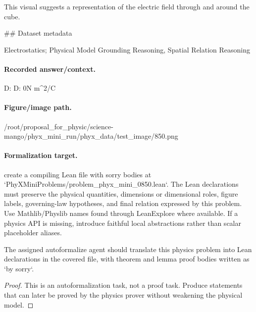 This visual suggests a representation of the electric field through and around the cube.

\#\# Dataset metadata

Electrostatics; Physical Model Grounding Reasoning, Spatial Relation Reasoning

\paragraph{Recorded answer/context.}
D: D: 0N m\textasciicircum{}2/C

\paragraph{Figure/image path.}
/root/proposal\_for\_physic/science-mango/phyx\_mini\_run/phyx\_data/test\_image/850.png

\paragraph{Formalization target.}
create a compiling Lean file with sorry bodies at `PhyXMiniProblems/problem\_phyx\_mini\_0850.lean`. The Lean declarations must preserve the physical quantities, dimensions or dimensional roles, figure labels, governing-law hypotheses, and final relation expressed by this problem.
Use Mathlib/Physlib names found through LeanExplore where available. If a physics API is missing, introduce faithful local abstractions rather than scalar placeholder aliases.

\begin{theorem}
\label{thm:physics:phyx_mini_0850:target}
The assigned autoformalize agent should translate this physics problem into Lean declarations in the covered file, with theorem and lemma proof bodies written as `by sorry`.
\end{theorem}
\begin{proof}
This is an autoformalization task, not a proof task. Produce statements that can later be proved by the physics prover without weakening the physical model.
\end{proof}

